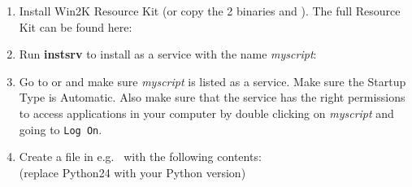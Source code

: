 \begin{enumerate}

\item Install Win2K \windowsindex Resource Kit (or copy the 2 binaries 
 and ). The full Resource Kit can be 
found here: \\
	  {\small {}}

\item Run {\bf instsrv} to install  as a service with the 
name {\it myscript}: \\
	  {\small {}} \windowsindex

\item Go to  or 
      and make sure {\it myscript} is listed as a service. Make sure the Startup Type is Automatic. Also make sure that the service has the right permissions to 
      access applications in your computer by double clicking on {\it myscript} and going to \verb|Log On|.

\item Create a  file in 
e.g.\  with the following contents: \\
	   \pythonindex
	  (replace Python24 \pythonversionindex with your Python \pythonindex version) 


\end{enumerate}
